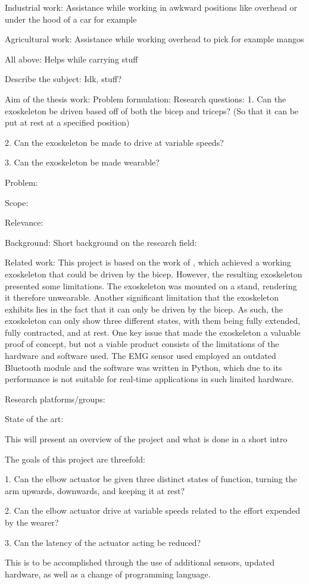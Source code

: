             Industrial work:
                Assistance while working in awkward positions like overhead or under the hood of a car for example

            Agricultural work:
                Assistance while working overhead to pick for example mangos
            
            All above:
                Helps while carrying stuff

    Describe the subject:
        Idk, stuff?

    Aim of the thesis work:
        Problem formulation: %
            Research questions:
                1.	Can the exoskeleton be driven based off of both the bicep and triceps? (So that it can be put at rest at a specified position)

                2.	Can the exoskeleton be made to drive at variable speeds?

                3.	Can the exoskeleton be made wearable?

            Problem:
                

            Scope:
            
            Relevance: %


Background: 
    Short background on the research field:

    Related work: %
        This project is based on the work of \cite{AFES}, which achieved a working exoskeleton that could be driven by the bicep. However, the resulting 
        exoskeleton presented some limitations. The exoskeleton was mounted on a stand, rendering it therefore unwearable. Another significant limitation 
        that the exoskeleton exhibits lies in the fact that it can only be driven by the bicep. As such, the exoskeleton can only show three different states, 
        with them being fully extended, fully contracted, and at rest. One key issue that made the exoskeleton a valuable proof of concept, but not a viable 
        product consists of the limitations of the hardware and software used. The EMG sensor used employed an outdated Bluetooth module and the software was 
        written in Python, which due to its performance is not suitable for real-time applications in such limited hardware.

    Research platforms/groups:

    State of the art:


    This will present an overview of the project and what is done in a short intro


The goals of this project are threefold:

1. Can the elbow actuator be given three distinct states of function, turning the arm upwards, downwards, and keeping it at rest?

2. Can the elbow actuator drive at variable speeds related to the effort expended by the wearer?

3. Can the latency of the actuator acting be reduced?

This is to be accomplished through the use of additional sensors, updated hardware, as well as a change of programming language.
